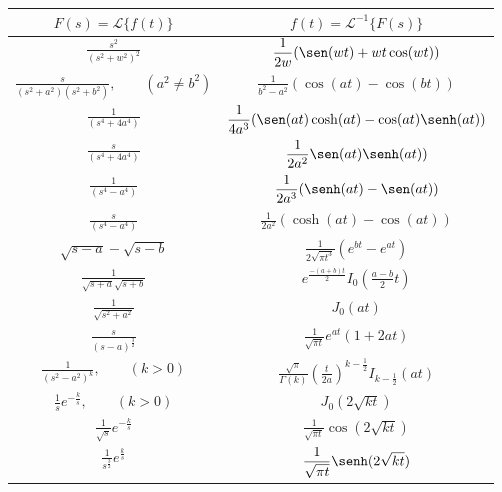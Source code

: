 \begin{table}%
\begin{small}
\begin{center}
{\renewcommand{\arraystretch}{1.9}%
\begin{tabular}{|c|c|}
\hline
 $\displaystyle F(s)=\mathcal{L }\{f(t)\} $&$\displaystyle  f(t)=\mathcal{L }^{-1}\{F(s)\}$ \\
\hline
 $\displaystyle \frac{s^2}{(s^2+w^2)^2} $&$\displaystyle  \frac{1}{2w}(\sen(wt)+wt\cos(wt))$ \\[1ex] 
\hline
 $\displaystyle \frac{s}{(s^2+a^2)(s^2+b^2)},\qquad (a^2\neq b^2) $&$\displaystyle  \frac{1}{b^2-a^2}(\cos(at)-\cos(bt))$ \\[1ex] 
\hline
 $\displaystyle \frac{1}{(s^4+4a^4)}$&$\displaystyle  \frac{1}{4a^3}(\sen(at)\cosh(at)-\cos(at)\senh(at))$ \\[1ex] 
\hline
$\displaystyle \frac{s}{(s^4+4a^4)} $&$\displaystyle  \frac{1}{2a^2}\sen(at)\senh(at))$ \\[2ex] 
\hline
 $\displaystyle \frac{1}{(s^4-a^4)} $&$\displaystyle  \frac{1}{2a^3}(\senh(at)-\sen(at))$ \\[1ex] 
\hline
 $\displaystyle \frac{s}{(s^4-a^4)} $&$\displaystyle  \frac{1}{2a^2}(\cosh(at)-\cos(at))$ \\[1ex] 
\hline
 $\displaystyle \sqrt{s-a}-\sqrt{s-b} $&$ \displaystyle  \frac{1}{2\sqrt{\pi t^3}}(e^{bt}-e^{at})$ \\[1ex] 
\hline
 $\displaystyle \frac{1}{\sqrt{s+a}\sqrt{s+b}} $&$\displaystyle  e^{\frac{-(a+b)t}{2}}I_0\left(\frac{a-b}{2}t\right)$ \\[1ex] 
\hline
 $\displaystyle \frac{1}{\sqrt{s^2+a^2}} $&$\displaystyle  J_0(at)$ \\[1ex] 
\hline
 $\displaystyle \frac{s}{(s-a)^{\frac{3}{2}}} $&$\displaystyle  \frac{1}{\sqrt{\pi t}}e^{at}(1+2at)$ \\[1ex] 
\hline
 $\displaystyle \frac{1}{(s^2-a^2)^k},\qquad (k>0) $&$\displaystyle  \frac{\sqrt{\pi}}{\Gamma(k)}\left(\frac{t}{2a}\right)^{k-\frac{1}{2}}I_{k-\frac{1}{2}}(at)$ \\[1ex] 
\hline
 $\displaystyle \frac{1}{s}e^{-\frac{k}{s}},\qquad (k>0)$&$\displaystyle  J_0(2\sqrt{kt})$ \\[1ex] 
\hline
 $\displaystyle \frac{1}{\sqrt{s}}e^{-\frac{k}{s}} $&$\displaystyle  \frac{1}{\sqrt{\pi t}}\cos(2\sqrt{k t})$ \\[1ex] 
\hline
 $\displaystyle \frac{1}{s^{\frac{3}{2}}}e^{\frac{k}{s}}$&$\displaystyle  \frac{1}{\sqrt{\pi t}}\senh(2\sqrt{k t})$ \\[1ex] 

\end{tabular}}
\end{center}
\end{small}
\end{table}
